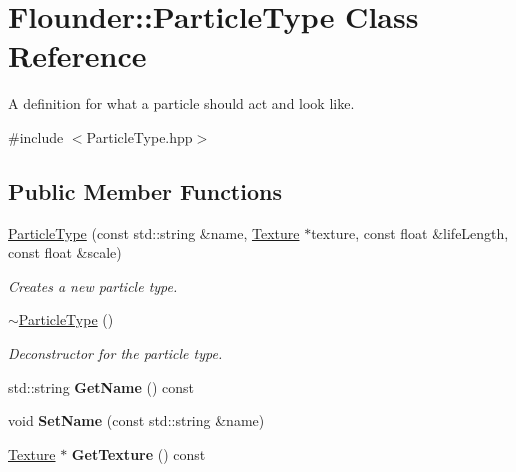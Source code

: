 \hypertarget{class_flounder_1_1_particle_type}{}\section{Flounder\+:\+:Particle\+Type Class Reference}
\label{class_flounder_1_1_particle_type}


A definition for what a particle should act and look like.  




{\ttfamily \#include $<$Particle\+Type.\+hpp$>$}

\subsection*{Public Member Functions}
\begin{DoxyCompactItemize}
\item 
\hyperlink{class_flounder_1_1_particle_type_a08ae007acbb1483a2dfdc97d2f860635}{Particle\+Type} (const std\+::string \&name, \hyperlink{class_flounder_1_1_texture}{Texture} $\ast$texture, const float \&life\+Length, const float \&scale)
\begin{DoxyCompactList}\small\item\em Creates a new particle type. \end{DoxyCompactList}\item 
\hyperlink{class_flounder_1_1_particle_type_ace69a384cf039e0aebfa505ca10c5655}{$\sim$\+Particle\+Type} ()
\begin{DoxyCompactList}\small\item\em Deconstructor for the particle type. \end{DoxyCompactList}\item 
\mbox{\label{class_flounder_1_1_particle_type_adc6b54c4599645850272ead4017bf08f}} 
std\+::string {\bfseries Get\+Name} () const
\item 
\mbox{\label{class_flounder_1_1_particle_type_a440cca9c8248aea4a4b450751de351a5}} 
void {\bfseries Set\+Name} (const std\+::string \&name)
\item 
\mbox{\label{class_flounder_1_1_particle_type_abedf93ec18d7bbdafd6b2848c75855d2}} 
\hyperlink{class_flounder_1_1_texture}{Texture} $\ast$ {\bfseries Get\+Texture} () const
\item 

\end{DoxyCompactItemize}
